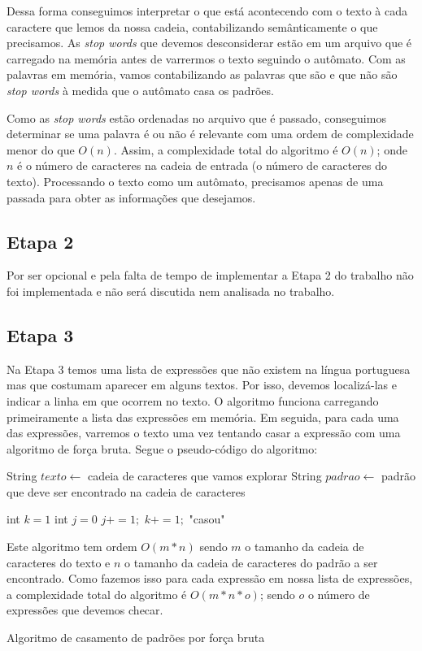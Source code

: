 \documentclass[12pt]{article}
\begin{document}
Dessa forma conseguimos interpretar o que está acontecendo com o texto à cada caractere que lemos da nossa cadeia, contabilizando semânticamente o que precisamos. As \textit{stop words} que devemos desconsiderar estão em um arquivo que é carregado na memória antes de varrermos o texto seguindo o autômato. Com as palavras em memória, vamos contabilizando as palavras que são e que não são \textit{stop words} à medida que o autômato casa os padrões. 

Como as \textit{stop words} estão ordenadas no arquivo que é passado, conseguimos determinar se uma palavra é ou não é relevante com uma ordem de complexidade menor do que $O(n)$. Assim, a complexidade total do algoritmo é $O(n)$; onde $n$ é o número de caracteres na cadeia de entrada (o número de caracteres do texto). Processando o texto como um autômato, precisamos apenas de uma passada para obter as informações que desejamos.

\subsection{Etapa 2}
Por ser opcional e pela falta de tempo de implementar a Etapa 2 do trabalho não foi implementada e não será discutida nem analisada no trabalho.

\subsection{Etapa 3}
Na Etapa 3 temos uma lista de expressões que não existem na língua portuguesa mas que costumam aparecer em alguns textos. Por isso, devemos localizá-las e indicar a linha em que ocorrem no texto. O algoritmo funciona carregando primeiramente a lista das expressões em memória. Em seguida, para cada uma das expressões, varremos o texto uma vez tentando casar a expressão com uma algoritmo de força bruta. Segue o pseudo-código do algoritmo:

\begin{algorithm}[h!]
\begin{footnotesize}
String $texto \longleftarrow$ cadeia de caracteres que vamos explorar\;
String $padrao\longleftarrow$ padrão que deve ser encontrado na cadeia de caracteres\;

{
  int $k = 1$\;
  int $j = 0$\;
  {
  	$j += 1;$
  	$k += 1;$
  	{
  		\Return "casou"\;
  	}
  }
}

Este algoritmo tem ordem $O(m * n)$ sendo $m$ o tamanho da cadeia de caracteres do texto e $n$ o tamanho da cadeia de caracteres do padrão a ser encontrado. Como fazemos isso para cada expressão em nossa lista de expressões, a complexidade total do algoritmo é $O(m * n * o)$; sendo $o$ o número de expressões que devemos checar.

\caption{Algoritmo de casamento de padrões por força bruta}
\end{footnotesize}
\end{algorithm}
\end{document}
